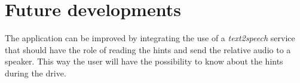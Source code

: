 \chapter{Future developments} \label{chap5}
The application can be improved by integrating the use of a \textit{text2speech} service that should have the role of reading the hints and send the relative audio to a speaker. This way the user will have the possibility to know about the hints during the drive.